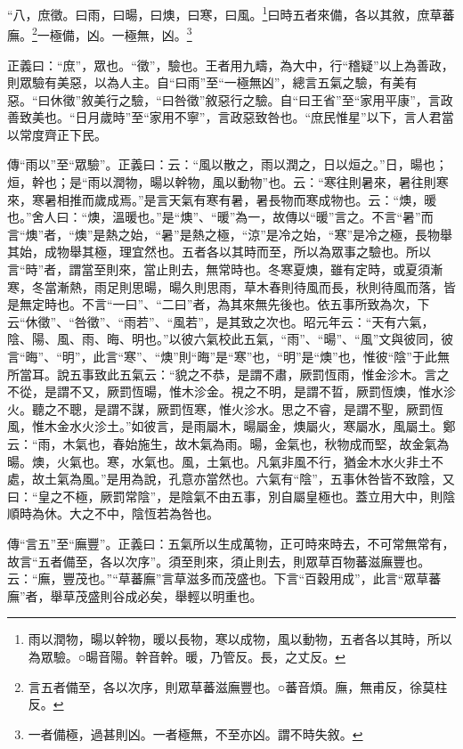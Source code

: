 “八，庶徵。曰雨，曰暘，曰燠，曰寒，曰風。\footnote{雨以潤物，暘以幹物，暖以長物，寒以成物，風以動物，五者各以其時，所以為眾驗。○暘音陽。幹音幹。暖，乃管反。長，之丈反。}曰時五者來備，各以其敘，庶草蕃廡。\footnote{言五者備至，各以次序，則眾草蕃滋廡豐也。○蕃音煩。廡，無甫反，徐莫柱反。}一極備，凶。一極無，凶。\footnote{一者備極，過甚則凶。一者極無，不至亦凶。謂不時失敘。}

{\noindent\shu{}\fzkt 正義曰：“庶”，眾也。“徵”，驗也。王者用九疇，為大中，行“稽疑”以上為善政，則眾驗有美惡，以為人主。自“曰雨”至“一極無凶”，總言五氣之驗，有美有惡。“曰休徵”敘美行之驗，“曰咎徵”敘惡行之驗。自“曰王省”至“家用平康”，言政善致美也。“日月歲時”至“家用不寧”，言政惡致咎也。“庶民惟星”以下，言人君當以常度齊正下民。 \par}

{\noindent\zhuan{}\fzbyks 傳“雨以”至“眾驗”。正義曰：云：“風以散之，雨以潤之，日以烜之。”日，暘也；烜，幹也；是“雨以潤物，暘以幹物，風以動物”也。云：“寒往則暑來，暑往則寒來，寒暑相推而歲成焉。”是言天氣有寒有暑，暑長物而寒成物也。云：“燠，暖也。”舍人曰：“燠，溫暖也。”是“燠”、“暖”為一，故傳以“暖”言之。不言“暑”而言“燠”者，“燠”是熱之始，“暑”是熱之極，“涼”是冷之始，“寒”是冷之極，長物舉其始，成物舉其極，理宜然也。五者各以其時而至，所以為眾事之驗也。所以言“時”者，謂當至則來，當止則去，無常時也。冬寒夏燠，雖有定時，或夏須漸寒，冬當漸熱，雨足則思暘，暘久則思雨，草木春則待風而長，秋則待風而落，皆是無定時也。不言“一曰”、“二曰”者，為其來無先後也。依五事所致為次，下云“休徵”、“咎徵”、“雨若”、“風若”，是其致之次也。昭元年云：“天有六氣，陰、陽、風、雨、晦、明也。”以彼六氣校此五氣，“雨”、“暘”、“風”文與彼同，彼言“晦”、“明”，此言“寒”、“燠”則“晦”是“寒”也，“明”是“燠”也，惟彼“陰”于此無所當耳。說五事致此五氣云：“貌之不恭，是謂不肅，厥罰恆雨，惟金沴木。言之不從，是謂不又，厥罰恆暘，惟木沴金。視之不明，是謂不晢，厥罰恆燠，惟水沴火。聽之不聰，是謂不謀，厥罰恆寒，惟火沴水。思之不睿，是謂不聖，厥罰恆風，惟木金水火沴土。”如彼言，是雨屬木，暘屬金，燠屬火，寒屬水，風屬土。鄭云：“雨，木氣也，春始施生，故木氣為雨。暘，金氣也，秋物成而堅，故金氣為暘。燠，火氣也。寒，水氣也。風，土氣也。凡氣非風不行，猶金木水火非土不處，故土氣為風。”是用為說，孔意亦當然也。六氣有“陰”，五事休咎皆不致陰，又曰：“皇之不極，厥罰常陰”，是陰氣不由五事，別自屬皇極也。蓋立用大中，則陰順時為休。大之不中，陰恆若為咎也。 \par}

{\noindent\zhuan{}\fzbyks 傳“言五”至“廡豐”。正義曰：五氣所以生成萬物，正可時來時去，不可常無常有，故言“五者備至，各以次序”。須至則來，須止則去，則眾草百物蕃滋廡豐也。云：“廡，豐茂也。”“草蕃廡”言草滋多而茂盛也。下言“百穀用成”，此言“眾草蕃廡”者，舉草茂盛則谷成必矣，舉輕以明重也。 \par}

